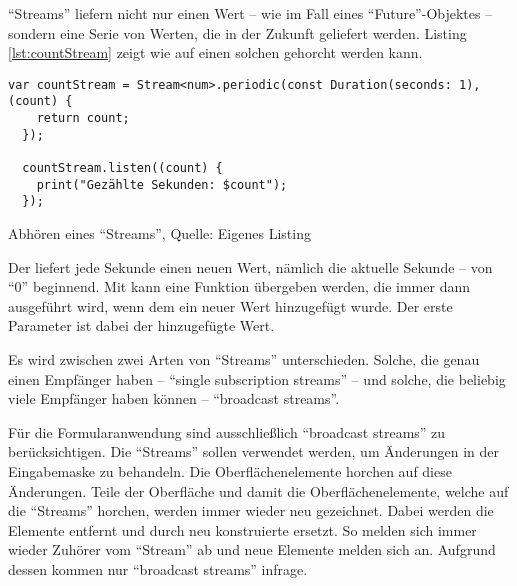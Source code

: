 \enquote{Streams} liefern nicht nur einen Wert -- wie im Fall eines \enquote{Future}-Objektes -- sondern eine Serie von Werten, die in der Zukunft geliefert werden.
Listing \ref{lst:countStream} zeigt wie auf einen solchen  gehorcht werden kann.
\ifIncludeFigures
  \begin{listing}[ht]
    \begin{verbatim}
var countStream = Stream<num>.periodic(const Duration(seconds: 1), (count) {
    return count;
  });

  countStream.listen((count) {
    print("Gezählte Sekunden: $count");
  });
\end{verbatim}
    \caption[Abhören eines \enquote{Streams}]{Abhören eines \enquote{Streams}, Quelle: Eigenes Listing}
    \label{lst:countStream}
  \end{listing}
\fi

Der  liefert jede Sekunde einen neuen Wert, nämlich die aktuelle Sekunde -- von \enquote{0} beginnend.
Mit  kann eine Funktion übergeben werden, die immer dann ausgeführt wird, wenn dem  ein neuer Wert hinzugefügt wurde.
Der erste Parameter  ist dabei der hinzugefügte Wert.



Es wird zwischen zwei Arten von \enquote{Streams} unterschieden.
Solche, die genau einen Empfänger haben -- \enquote{single subscription streams} -- und solche, die beliebig viele Empfänger haben können -- \enquote{broadcast streams}.

Für die Formularanwendung sind ausschließlich \enquote{broadcast streams} zu berücksichtigen.
Die \enquote{Streams} sollen verwendet werden, um Änderungen in der Eingabemaske zu behandeln.
Die  Oberflächenelemente horchen auf diese Änderungen.
Teile der Oberfläche und damit die Oberflächenelemente, welche auf die \enquote{Streams} horchen, werden immer wieder neu gezeichnet.
Dabei werden die Elemente entfernt und durch neu konstruierte ersetzt.
So melden sich immer wieder Zuhörer vom \enquote{Stream} ab und neue Elemente melden sich an.
Aufgrund dessen kommen nur \enquote{broadcast streams} infrage.


